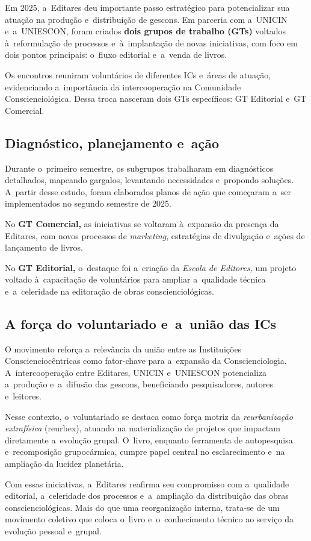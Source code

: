 \documentclass{gescons}
\begin{document}
    
    \begin{multicols}{2}



Em 2025, a~Editares deu importante passo estratégico para potencializar sua atuação na produção e~distribuição de gescons. Em parceria com a~UNICIN e~a~UNIESCON, foram criados \textbf{dois grupos de trabalho (GTs)} voltados à~reformulação de processos e~à~implantação de novas iniciativas, com foco em dois pontos principais: o~fluxo editorial e~a~venda de livros.

Os encontros reuniram voluntários de diferentes ICs e~áreas de atuação, evidenciando a~importância da intercooperação na Comunidade Conscienciológica. Dessa troca nasceram dois GTs específicos: GT Editorial e~GT Comercial.

\subsection*{Diagnóstico, planejamento e~ação}

Durante o~primeiro semestre, os subgrupos trabalharam em diagnósticos detalhados, mapeando gargalos, levantando necessidades e~propondo soluções. A~partir desse estudo, foram elaborados planos de ação que começaram a~ser implementados no segundo semestre de 2025.

No \textbf{GT Comercial,} as iniciativas se voltaram à~expansão da presença da Editares, com novos processos de \emph{marketing}, estratégias de divulgação e~ações de lançamento de livros. 

No \textbf{GT Editorial,} o~destaque foi a~criação da \emph{Escola de Editores,} um projeto voltado à~capacitação de voluntários para ampliar a~qualidade técnica e~a~celeridade na editoração de obras conscienciológicas.

\subsection*{A força do voluntariado e~a~união das ICs}

O movimento reforça a~relevância da união entre as Instituições Conscienciocêntricas como fator-chave para a~expansão da Conscienciologia. A~intercooperação entre Editares, UNICIN e~UNIESCON potencializa a~produção e~a~difusão das gescons, beneficiando pesquisadores, autores e~leitores.

Nesse contexto, o~voluntariado se destaca como força motriz da \emph{reurbanização extrafísica} (reurbex), atuando na materialização de projetos que impactam diretamente a~evolução grupal. O~livro, enquanto ferramenta de autopesquisa e~recomposição grupocármica, cumpre papel central no esclarecimento e~na ampliação da lucidez planetária.

Com essas iniciativas, a~Editares reafirma seu compromisso com a~qualidade editorial, a~celeridade dos processos e~a~ampliação da distribuição das obras conscienciológicas. Mais do que uma reorganização interna, trata-se de um movimento coletivo que coloca o~livro e~o~conhecimento técnico ao serviço da evolução pessoal e~grupal.





    \end{multicols}
\end{document}
